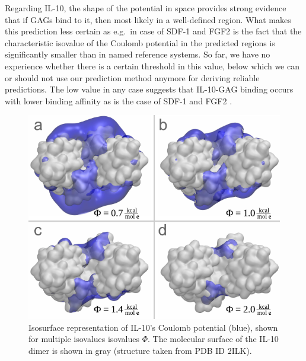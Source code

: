 Regarding IL-10, the shape of the potential in space provides strong evidence
that if GAGs bind to it, then most likely in a well-defined region. What makes
this prediction less certain as e.g.\ in case of SDF-1 and FGF2 is the fact that
the characteristic isovalue of the Coulomb potential in the predicted regions is
significantly smaller than in named reference systems. So far, we have no
experience whether there is a certain threshold in this value, below which we
can or should not use our prediction method anymore for deriving reliable
predictions. The low value in any case suggests that IL-10-GAG binding occurs
with lower binding affinity as is the case of  SDF-1 and FGF2 .

\begin{figure}
\centering
\includegraphics[width=1.0\textwidth]{gfx/bspred/il10_top_coulomb_isosurfaces_different_values_03_ds.pdf}
\caption[]{
Isosurface representation of IL-10's Coulomb potential (blue), shown for
multiple isovalues isovalues $\Phi$. The molecular surface of the IL-10 dimer is
shown in gray (structure taken from PDB ID 2ILK).
}
\label{fig:bspred:il10_multi_iso}
\end{figure}


